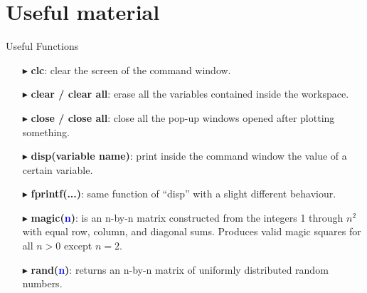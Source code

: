 \documentclass[xcolor={dvipsnames,rgb}, aspectratio=169]{beamer}
\begin{document}
\section{Useful material}
\begin{frame}{Useful Functions}
\begin{itemize}
   \item[$\blacktriangleright$] \textbf{clc}: clear the screen of the command window.
   \item[$\blacktriangleright$] \textbf{clear / clear all}: erase all the variables
      contained inside the workspace.
   \item[$\blacktriangleright$] \textbf{close / close all}: close all the pop-up windows
      opened after plotting something.
   \item[$\blacktriangleright$] \textbf{disp(variable name)}: print inside the command
      window the value of a certain variable.
   \item[$\blacktriangleright$] \textbf{fprintf(...)}: same function of ``disp'' with a
      slight different behaviour.
   \item[$\blacktriangleright$] \textbf{magic(\textcolor{blue}{n})}: is an n-by-n matrix
      constructed from the integers 1 through $n^2$ with equal row, column, and diagonal
      sums. Produces valid magic squares for all $n > 0$ except $n = 2$.
   \item[$\blacktriangleright$] \textbf{rand(\textcolor{blue}{n})}: returns an n-by-n
      matrix of uniformly distributed random numbers.
\end{itemize}
\end{frame}
\end{document}

